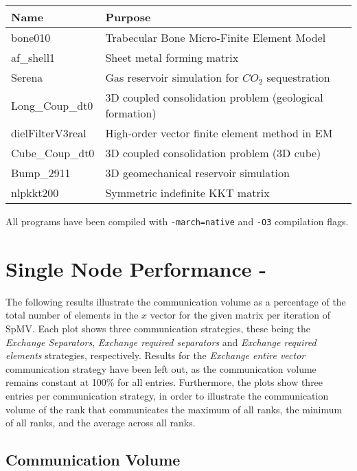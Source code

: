 \begin{table}[H]
\begin{center}
\begin{tabular}[c]{|l|l|}
\hline
\textbf{Name}&\textbf{Purpose}  \\
\hline
bone010&Trabecular Bone Micro-Finite Element Model\\
\hline
af\_shell1&Sheet metal forming matrix\\
\hline
Serena&Gas reservoir simulation for \(CO_{2}\) sequestration\\
\hline
Long\_Coup\_dt0&3D coupled consolidation problem (geological formation)\\
\hline
dielFilterV3real&High-order vector finite element method in EM\\
\hline
Cube\_Coup\_dt0&3D coupled consolidation problem (3D cube)\\
\hline
Bump\_2911&3D geomechanical reservoir simulation\\
\hline
nlpkkt200&Symmetric indefinite KKT matrix\\
\end{tabular}
\end{center}
\end{table}

All programs have been compiled with \texttt{-march=native} and \texttt{-O3} compilation flags.

\section{Single Node Performance - }
The following results illustrate the communication volume as a percentage of the total number of elements in the \(x\) vector for the given matrix per iteration of SpMV. Each plot shows three communication strategies, these being the \textit{Exchange Separators}, \textit{Exchange required separators} and \textit{Exchange required elements} strategies, respectively. Results for the \textit{Exchange entire vector} communication strategy have been left out, as the communication volume remains constant at 100\% for all entries. Furthermore, the plots show three entries per communication strategy, in order to illustrate the communication volume of the rank that communicates the maximum of all ranks, the minimum of all ranks, and the average across all ranks.
\medskip

\subsection{Communication Volume}

